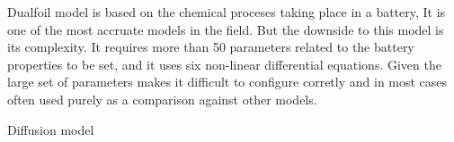 Dualfoil model is based on the chemical proceses taking place in a battery, It is one of the most accruate models in the field. But the downside to this model is its complexity. It requires more than 50 parameters related to the battery properties to be set, and it uses six non-linear differential equations. Given the large set of parameters makes it difficult to configure corretly and in most cases often used purely as a comparison against other models.

Diffusion model










